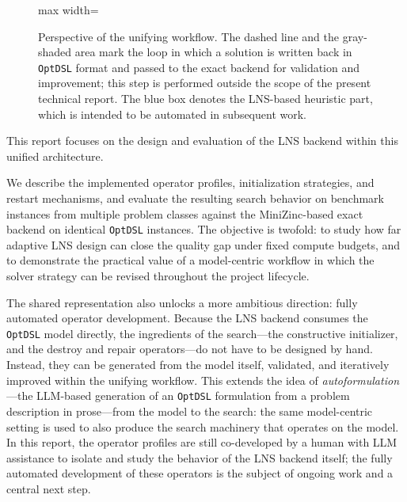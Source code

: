 \documentclass[11pt,a4paper]{article}
\begin{document}
\begin{figure}[t]
\begin{adjustbox}{max width=\textwidth}
\end{adjustbox}
\caption{Perspective of the unifying workflow. The dashed line and the gray-shaded area mark the loop in which a solution is written back in \texttt{OptDSL} format and passed to the exact backend for validation and improvement; this step is performed outside the scope of the present technical report. The blue box denotes the LNS-based heuristic part, which is intended to be automated in subsequent work.}
\label{fig:optdsl-validation}
\end{figure}

This report focuses on the design and evaluation of the LNS backend within this unified architecture.

We describe the implemented operator profiles, initialization strategies, and restart mechanisms, and evaluate the resulting search behavior on benchmark instances from multiple problem classes against the MiniZinc-based exact backend on identical \texttt{OptDSL} instances.
The objective is twofold: to study how far adaptive LNS design can close the quality gap under fixed compute budgets, and to demonstrate the practical value of a model-centric workflow in which the solver strategy can be revised throughout the project lifecycle.

The shared representation also unlocks a more ambitious direction: fully automated operator development.
Because the LNS backend consumes the \texttt{OptDSL} model directly, the ingredients of the search---the constructive initializer, and the destroy and repair operators---do not have to be designed by hand.
Instead, they can be generated from the model itself, validated, and iteratively improved within the unifying workflow.
This extends the idea of \emph{autoformulation} \citep{blaimschein2026autoformulation}---the LLM-based generation of an \texttt{OptDSL} formulation from a problem description in prose---from the model to the search: the same model-centric setting is used to also produce the search machinery that operates on the model.
In this report, the operator profiles are still co-developed by a human with LLM assistance to isolate and study the behavior of the LNS backend itself; the fully automated development of these operators is the subject of ongoing work and a central next step.
\end{document}
